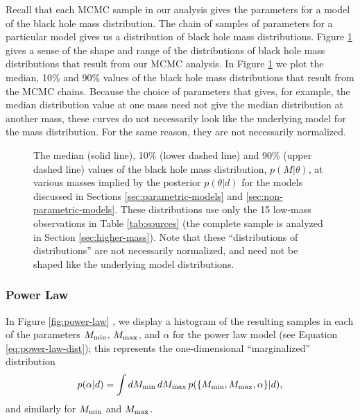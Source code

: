 \documentclass[preprint]{aastex}
\newcommand{\Mmin}{M_{\textnormal{min}}}
\newcommand{\Mmax}{M_{\textnormal{max}}}
\begin{document}
Recall that each MCMC sample in our analysis gives the parameters for
a model of the black hole mass distribution.  The chain of samples of
parameters for a particular model gives us a distribution of black
hole mass distributions.  Figure \ref{fig:dists} gives a sense of the
shape and range of the distributions of black hole mass distributions
that result from our MCMC analysis.  In Figure \ref{fig:dists} we plot
the median, 10\% and 90\% values of the black hole mass distributions
that result from the MCMC chains.  Because the choice of parameters
that gives, for example, the median distribution value at one mass
need not give the median distribution at another mass, these curves do
not necessarily look like the underlying model for the mass
distribution.  For the same reason, they are not necessarily
normalized.

\begin{figure}
  \begin{center}
  \end{center}
  \caption{\label{fig:dists} The median (solid line), 10\% (lower
    dashed line) and 90\% (upper dashed line) values of the black hole
    mass distribution, $p(M|\theta)$, at various masses implied by the
    posterior $p(\theta|d)$ for the models discussed in Sections
    \ref{sec:parametric-models} and \ref{sec:non-parametric-models}.
    These distributions use only the 15 low-mass observations in Table
    \ref{tab:sources} (the complete sample is analyzed in Section
    \ref{sec:higher-mass}).  Note that these ``distributions of
    distributions'' are not necessarily normalized, and need not be
    shaped like the underlying model distributions.}
\end{figure}

\subsubsection{Power Law}

In Figure \ref{fig:power-law} , we display a histogram of the
resulting samples in each of the parameters $\Mmin$, $\Mmax$, and
$\alpha$ for the power law model (see Equation
\eqref{eq:power-law-dist}); this represents the one-dimensional
``marginalized'' distribution
\begin{equation}
  \label{eq:alpha-pdf}
  p(\alpha|d) = \int d\Mmin\, d\Mmax\, p(\{\Mmin, \Mmax, \alpha\}|d),
\end{equation}
and similarly for $\Mmin$ and $\Mmax$.
\end{document}
